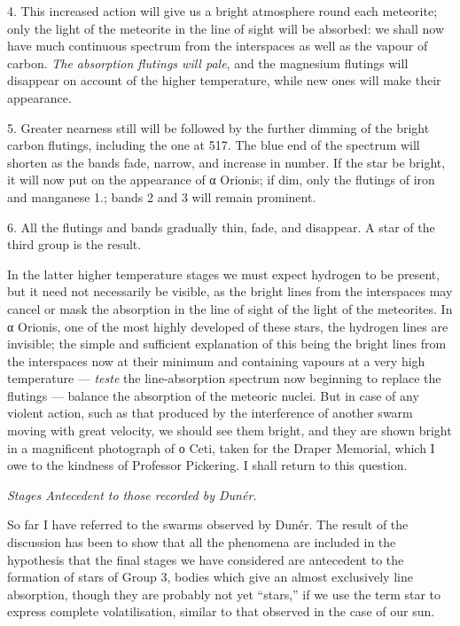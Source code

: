 \documentclass[a4paper, 12pt, oneside, polutonikogreek, english]{article}
\begin{document}
4. This increased action will give us a bright atmosphere round each meteorite; only the light of the meteorite in the line of sight will be absorbed: we shall now have much continuous spectrum from the interspaces as well as the vapour of carbon. \emph{The absorption flutings will pale}, and the magnesium flutings will disappear on account of the higher temperature, while new ones will make their appearance.

5. Greater nearness still will be followed by the further dimming of the bright carbon flutings, including the one at 517. The blue end of the spectrum will shorten as the bands fade, narrow, and increase in number. If the star be bright, it will now put on the appearance of α Orionis; if dim, only the flutings of iron and manganese 1.; bands 2 and 3 will remain prominent.

6. All the flutings and bands gradually thin, fade, and disappear. A star of the third group is the result.

In the latter higher temperature stages we must expect hydrogen to be present, but it need not necessarily be visible, as the bright lines from the interspaces may cancel or mask the absorption in the line of sight of the light of the meteorites. In α Orionis, one of the most highly developed of these stars, the hydrogen lines are invisible; the simple and sufficient explanation of this being the bright lines from the interspaces now at their minimum and containing vapours at a very high temperature --- \emph{teste} the line-absorption spectrum now beginning to replace the flutings --- balance the absorption of the meteoric nuclei. But in case of any violent action, such as that produced by the interference of another swarm moving with great velocity, we should see them bright, and they are shown bright in a magnificent photograph of ο Ceti, taken for the Draper Memorial, which I owe to the kindness of Professor Pickering. I shall return to this question.

\emph{Stages Antecedent to those recorded by Dunér.}

So far I have referred to the swarms observed by Dunér. The result of the discussion has been to show that all the phenomena are included in the hypothesis that the final stages we have considered are antecedent to the formation of stars of Group 3, bodies which give an almost exclusively line absorption, though they are probably not yet ``stars,'' if we use the term star to express complete volatilisation, similar to that observed in the case of our sun.
\end{document}
